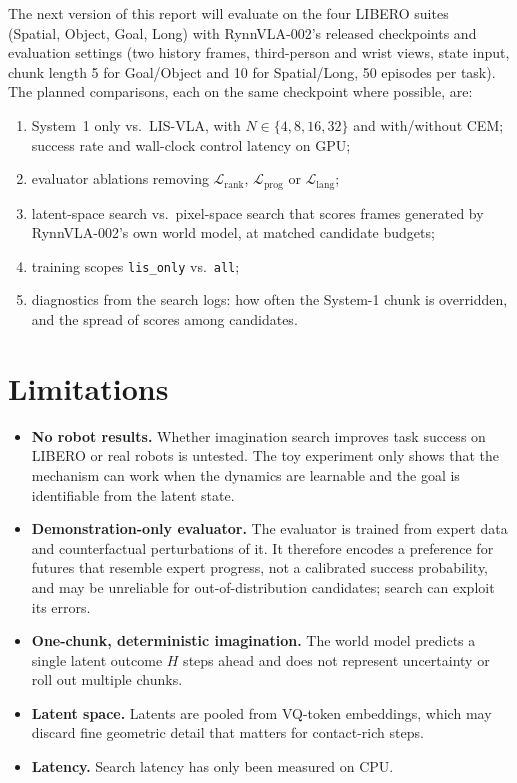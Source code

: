 \documentclass[11pt]{article}
\begin{document}
The next version of this report will evaluate on the four LIBERO suites~\citep{liu2023libero} (Spatial, Object, Goal, Long) with RynnVLA-002's released checkpoints and evaluation settings (two history frames, third-person and wrist views, state input, chunk length 5 for Goal/Object and 10 for Spatial/Long, 50 episodes per task). The planned comparisons, each on the same checkpoint where possible, are:
\begin{enumerate}[leftmargin=*,itemsep=2pt]
  \item System~1 only vs.\ LIS-VLA, with $N\in\{4,8,16,32\}$ and with/without CEM; success rate and wall-clock control latency on GPU;
  \item evaluator ablations removing $\mathcal L_{\mathrm{rank}}$, $\mathcal L_{\mathrm{prog}}$ or $\mathcal L_{\mathrm{lang}}$;
  \item latent-space search vs.\ pixel-space search that scores frames generated by RynnVLA-002's own world model, at matched candidate budgets;
  \item training scopes \texttt{lis\_only} vs.\ \texttt{all};
  \item diagnostics from the search logs: how often the System-1 chunk is overridden, and the spread of scores among candidates.
\end{enumerate}

\section{Limitations}
\label{sec:limitations}
\begin{itemize}[leftmargin=*,itemsep=2pt]
  \item \textbf{No robot results.} Whether imagination search improves task success on LIBERO or real robots is untested. The toy experiment only shows that the mechanism can work when the dynamics are learnable and the goal is identifiable from the latent state.
  \item \textbf{Demonstration-only evaluator.} The evaluator is trained from expert data and counterfactual perturbations of it. It therefore encodes a preference for futures that resemble expert progress, not a calibrated success probability, and may be unreliable for out-of-distribution candidates; search can exploit its errors.
  \item \textbf{One-chunk, deterministic imagination.} The world model predicts a single latent outcome $H$ steps ahead and does not represent uncertainty or roll out multiple chunks.
  \item \textbf{Latent space.} Latents are pooled from VQ-token embeddings, which may discard fine geometric detail that matters for contact-rich steps.
  \item \textbf{Latency.} Search latency has only been measured on CPU.
\end{itemize}
\end{document}
